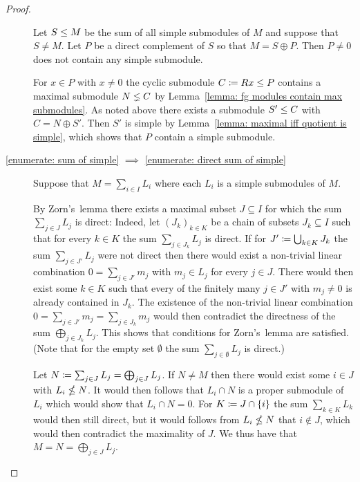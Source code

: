 \begin{proof}
\begin{description}
      Let $S \leq M$ be the sum of all simple submodules of $M$ and suppose that $S \neq M$.
      Let $P$ be a direct complement of $S$ so that $M = S \oplus P$.
      Then $P \neq 0$ does not contain any simple submodule.
      
      For $x \in P$ with $x \neq 0$ the cyclic submodule $C \coloneqq Rx \leq P$ contains a maximal submodule $N \lneq C$ by Lemma~\ref{lemma: fg modules contain max submodules}.
      As noted above there exists a submodule $S' \leq C$ with $C = N \oplus S'$.
      Then $S'$ is simple by Lemma~\ref{lemma: maximal iff quotient is simple}, which shows that $P$ contain a simple submodule.
    \item[\ref*{enumerate: sum of simple} $\implies$ \ref*{enumerate: direct sum of simple}]
      Suppose that $M = \sum_{i \in I} L_i$ where each $L_i$ is a simple submodules of $M$.
      
      By Zorn’s~lemma there exists a maximal subset $J \subseteq I$ for which the sum $\sum_{j \in J} L_j$ is direct:
      Indeed, let $(J_k)_{k \in K}$ be a chain of subsets $J_k \subseteq I$ such that for every $k \in K$ the sum $\sum_{j \in J_k} L_j$ is direct.
      If for $J' \coloneqq \bigcup_{k \in K} J_k$ the sum $\sum_{j \in J'} L_j$ were not direct then there would exist a non-trivial linear combination $0 = \sum_{j \in J'} m_j$ with $m_j \in L_j$ for every $j \in J$.
      There would then exist some $k \in K$ such that every of the finitely many $j \in J'$ with $m_j \neq 0$ is already contained in $J_k$.
      The existence of the non-trivial linear combination $0 = \sum_{j \in J'} m_j = \sum_{j \in J_k} m_j$ would then contradict the directness of the sum $\bigoplus_{j \in J_k} L_j$.
      This shows that conditions for Zorn’s~lemma are satisfied.
      (Note that for the empty set $\emptyset$ the sum $\sum_{j \in \emptyset} L_j$ is direct.)
      
      Let $N \coloneqq \sum_{j \in J} L_j = \bigoplus_{j \in J} L_j$.
      If $N \neq M$ then there would exist some $i \in J$ with $L_i \nleq N$.
      It would then follows that $L_i \cap N$ is a proper submodule of $L_i$ which would show that $L_i \cap N = 0$.
      For $K \coloneqq J \cap \{i\}$ the sum $\sum_{k \in K} L_k$ would then still direct, but it would follows from $L_i \nleq N$ that $i \notin J$, which would then contradict the maximality of $J$.
      We thus have that $M = N = \bigoplus_{j \in J} L_j$.
    \qedhere
  \end{description}
\end{proof}


